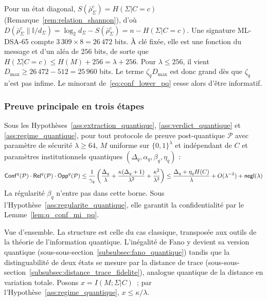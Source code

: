 \begin{sloppypar}
\begin{Preuve}
Pour un \'etat diagonal, $S(\bar\rho_\Sigma^c) = H(\Sigma|C=c)$
(Remarque~\ref{rem:relation_shannon}), d'o\`u
$D(\bar\rho_\Sigma^c\|\mathbb{I}/d_\Sigma) = \log_2 d_\Sigma - S(\bar\rho_\Sigma^c) = n - H(\Sigma|C=c)$.
Une signature ML-DSA-65 compte $3\,309 \times 8 = 26\,472$ bits. \`A cl\'e fix\'ee,
elle est une fonction du message et d'un al\'ea de $256$ bits, de sorte que
$H(\Sigma|C=c) \leq H(M) + 256 = \lambda + 256$. Pour $\lambda \leq 256$, il vient
$D_{\max} \geq 26\,472 - 512 = 25\,960$ bits. Le terme $\zeta_q D_{\max}$ est donc
grand d\`es que $\zeta_q$ n'est pas infime. Le minorant
de~\eqref{eq:conf_lower_pq} cesse alors d'\^etre informatif.
\end{Preuve}

\subsubsection{Preuve principale en trois \'etapes}
\label{subsubsec:preuve_trois_etapes}

\begin{theorem}
\label{thm:trilemme_pq}
Sous les Hypoth\`eses~\ref{ass:extraction_quantique},
\ref{ass:verdict_quantique} et
\ref{ass:regime_quantique}, pour tout protocole de preuve post-quantique
$\mathcal{P}$ avec param\`etre de s\'ecurit\'e $\lambda \geq 64$,
$M$ uniforme sur $\{0,1\}^\lambda$ et ind\'ependant de $C$ et
param\`etres institutionnels quantiques $(\Delta_q, \alpha_q, \beta_q,
\eta_q)$ :
\begin{equation}
\mathsf{Conf}^q(\mathcal{P}) \cdot \mathsf{Rel}^q(\mathcal{P}) \cdot \mathsf{Opp}^q(\mathcal{P}) \leq \frac{1}{\gamma_q}\left(\frac{\Delta_q}{\lambda} + \frac{\kappa(\Delta_q+1)}{\lambda^2} + \frac{\kappa^2}{\lambda^3}\right) \leq \frac{\Delta_q + \eta_q H(C)}{\lambda} + O(\lambda^{-2}) + \mathsf{negl}(\lambda)
\label{eq:trilemme_pq}
\end{equation}
La r\'egularit\'e $\beta_q$ n'entre pas dans cette borne. Sous
l'Hypoth\`ese~\ref{ass:regularite_quantique}, elle garantit la confidentialit\'e par le
Lemme~\ref{lem:q_conf_mi_pq}.
\end{theorem}

\begin{Preuve}
\begin{cmtEtape}{Vue d'ensemble.}
La structure est celle du cas classique, transpos\'ee aux outils de la
th\'eorie de l'information quantique. L'in\'egalit\'e de Fano y devient sa
version quantique (sous-sous-section~\ref{subsubsec:fano_quantique}) tandis que la
distinguabilit\'e de deux \'etats se mesure par la distance de trace
(sous-sous-section~\ref{subsubsec:distance_trace_fidelite}), analogue quantique de la distance en variation totale. Posons $x = I(M;\Sigma|C)$~; par
l'Hypoth\`ese~\ref{ass:regime_quantique}, $x \leq \kappa/\lambda$.
\end{cmtEtape}


\end{Preuve}
\end{sloppypar}
